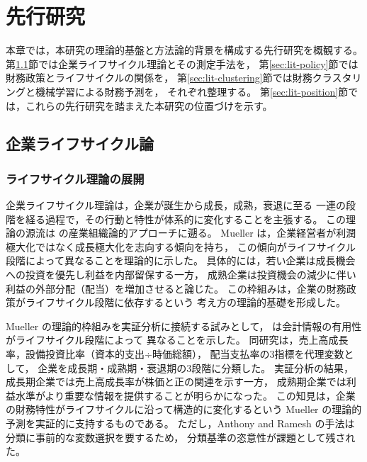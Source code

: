 \chapter{先行研究}
\label{chap:literature}

本章では，本研究の理論的基盤と方法論的背景を構成する先行研究を概観する。
第\ref{sec:lit-lifecycle}節では企業ライフサイクル理論とその測定手法を，
第\ref{sec:lit-policy}節では財務政策とライフサイクルの関係を，
第\ref{sec:lit-clustering}節では財務クラスタリングと機械学習による財務予測を，
それぞれ整理する。
第\ref{sec:lit-position}節では，これらの先行研究を踏まえた本研究の位置づけを示す。

\section{企業ライフサイクル論}
\label{sec:lit-lifecycle}

\subsection{ライフサイクル理論の展開}

企業ライフサイクル理論は，企業が誕生から成長，成熟，衰退に至る
一連の段階を経る過程で，その行動と特性が体系的に変化することを主張する。
この理論の源流は  の産業組織論的アプローチに遡る。
Mueller は，企業経営者が利潤極大化ではなく成長極大化を志向する傾向を持ち，
この傾向がライフサイクル段階によって異なることを理論的に示した。
具体的には，若い企業は成長機会への投資を優先し利益を内部留保する一方，
成熟企業は投資機会の減少に伴い利益の外部分配（配当）を増加させると論じた。
この枠組みは，企業の財務政策がライフサイクル段階に依存するという
考え方の理論的基礎を形成した。

Mueller の理論的枠組みを実証分析に接続する試みとして，
 は会計情報の有用性がライフサイクル段階によって
異なることを示した。
同研究は，売上高成長率，設備投資比率（資本的支出÷時価総額），
配当支払率の3指標を代理変数として，
企業を成長期・成熟期・衰退期の3段階に分類した。
実証分析の結果，成長期企業では売上高成長率が株価と正の関連を示す一方，
成熟期企業では利益水準がより重要な情報を提供することが明らかになった。
この知見は，企業の財務特性がライフサイクルに沿って構造的に変化するという
Mueller の理論的予測を実証的に支持するものである。
ただし，Anthony and Ramesh の手法は分類に事前的な変数選択を要するため，
分類基準の恣意性が課題として残された。

